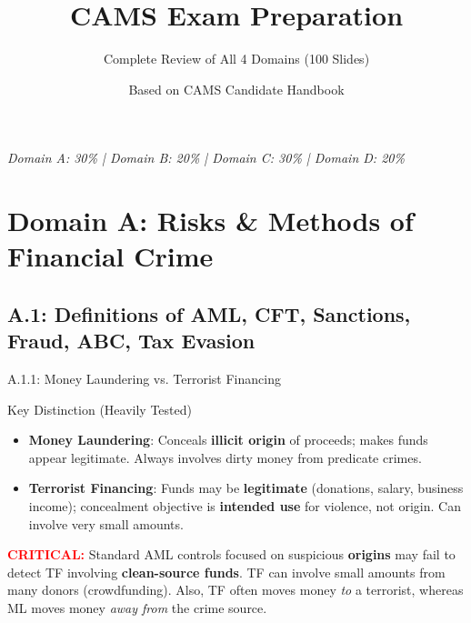 \documentclass{beamer}
\title{CAMS Exam Preparation}
\subtitle{Complete Review of All 4 Domains (100 Slides)}
\author{Based on CAMS Candidate Handbook}
\date{}
\begin{document}
	
	\begin{frame}
		\titlepage
		\centering
		\textit{Domain A: 30\% | Domain B: 20\% | Domain C: 30\% | Domain D: 20\%}
	\end{frame}
	
	
	\section{Domain A: Risks \& Methods of Financial Crime}
	
	\subsection{A.1: Definitions of AML, CFT, Sanctions, Fraud, ABC, Tax Evasion}
	
	\begin{frame}{A.1.1: Money Laundering vs. Terrorist Financing}
		\begin{block}{Key Distinction (Heavily Tested)}
			\begin{itemize}
				\item \textbf{Money Laundering}: Conceals \textbf{illicit origin} of proceeds; makes funds appear legitimate. Always involves dirty money from predicate crimes.
				\item \textbf{Terrorist Financing}: Funds may be \textbf{legitimate} (donations, salary, business income); concealment objective is \textbf{intended use} for violence, not origin. Can involve very small amounts.
			\end{itemize}
		\end{block}
		\textcolor{red}{\textbf{ CRITICAL:}} Standard AML controls focused on suspicious \textbf{origins} may fail to detect TF involving \textbf{clean-source funds}. TF can involve small amounts from many donors (crowdfunding). Also, TF often moves money \textit{to} a terrorist, whereas ML moves money \textit{away from} the crime source.
	\end{frame}
	
\end{document}
